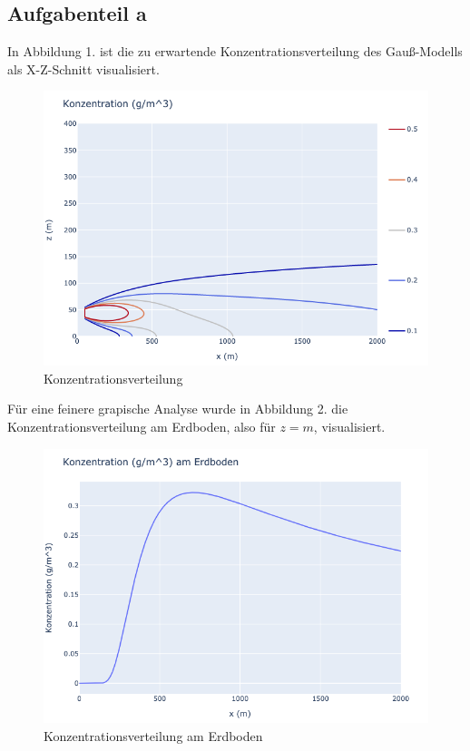 \documentclass[ngerman]{scrartcl}
\begin{document}
\subsection{Aufgabenteil a}
In Abbildung 1. ist die zu erwartende Konzentrationsverteilung des Gauß-Modells als X-Z-Schnitt visualisiert.
\begin{figure}[H]
	\centering
	\includegraphics[scale=0.5]{Bilder/1a.png}
	\caption{Konzentrationsverteilung}
	\label{fig:my_label}
\end{figure}
Für eine feinere grapische Analyse wurde in Abbildung 2. die Konzentrationsverteilung am Erdboden, also für $z=\si{m}$, visualisiert.
\begin{figure}[H]
	\centering
	\includegraphics[scale=0.5]{Bilder/1b.png}
	\caption{Konzentrationsverteilung am Erdboden}
	\label{fig:my_label}
\end{figure}
\end{document}
